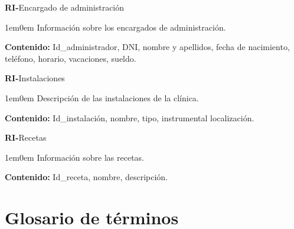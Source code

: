 \documentclass[12pt,a4paper]{article}
\newcounter{RICounter}
\newenvironment{rienv}[1]
	{\addtocounter{RICounter}{1}\textbf{\rmfamily RI-\theRICounter}\quad#1\begin{adjustwidth}{1em}{0em}}
	{\end{adjustwidth}}
\begin{document}
\begin{rienv}{Encargado de administración}
	Información sobre los encargados de administración.

  	\textbf{Contenido:} Id\_administrador, DNI, nombre y apellidos, fecha de nacimiento, teléfono, horario, vacaciones, sueldo.
\end{rienv}
  
\begin{rienv}{Instalaciones}
	Descripción de las instalaciones de la clínica.

  	\textbf{Contenido:} Id\_instalación, nombre, tipo, instrumental localización.
\end{rienv}

\begin{rienv}{Recetas}
	Información sobre las recetas.

  	\textbf{Contenido:} Id\_receta, nombre, descripción.
\end{rienv}
  

\section{Glosario de términos} %
\label{sec:glosario_de_términos}
\end{document}
